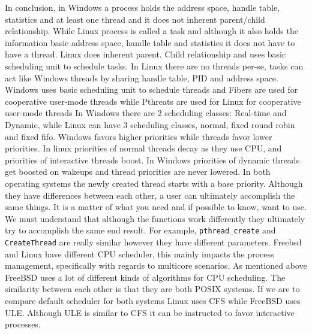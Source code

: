 \documentclass[letterpaper,10pt,draftclsnofoot,onecolumn]{IEEEtran}
\begin{document}
In conclusion, in Windows a process holds the address space, handle table, statistics and at least one thread and it does not inherent parent/child relationship. While Linux process is called a task and although it also holds the information basic address space, handle table and statistics it does not have to have a thread. Linux does inherent parent. Child relationship and uses basic scheduling unit to schedule tasks. In Linux there are no threads per-se, tasks can act like Windows threads by sharing handle table, PID and address space. Windows uses basic scheduling unit to schedule threads and Fibers are used for cooperative user-mode threads while Pthreats are used for Linux for cooperative user-mode threads
In Windows there are 2 scheduling classes: Real-time and Dynamic, while Linux can have 3 scheduling classes, normal, fixed round robin and fixed fifo. Windows favors higher priorities while threads favor lower priorities. In linux priorities of normal threads decay as they use CPU, and priorities of interactive threads boost. In Windows priorities of dynamic threads get boosted on wakeups and thread priorities are never lowered. In both operating systems the newly created thread starts with a base priority.
Although they have differences between each other, a user can ultimately accomplish the same things. It is a matter of what you need and if possible to know, want to use. We must understand that although the functions work differently they ultimately try to accomplish the same end result. For example, \verb|pthread_create| and \verb|CreateThread| are really similar however they have different parameters.
Freebsd and Linux have different CPU scheduler, this mainly impacts the process management, specifically with regards to multicore scenarios. As mentioned above FreeBSD uses a lot of different kinds of algorithms for CPU scheduling. The similarity between each other is that they are both POSIX systems. If we are to compare default scheduler for both systems Linux uses CFS while FreeBSD uses ULE. Although ULE is similar to CFS it can be instructed to favor interactive processes.
\end{document}
